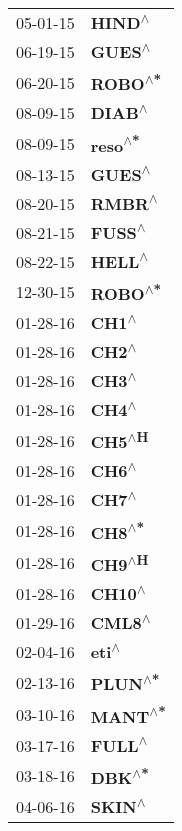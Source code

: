 \begin{supertabular}{p{0.08\textwidth}p{0.2\textwidth}}
 05-01-15 &    \textbf{HIND\textsuperscript{$\wedge$}} \\
 06-19-15 &    \textbf{GUES\textsuperscript{$\wedge$}} \\
 06-20-15 &   \textbf{ROBO\textsuperscript{$\wedge$*}} \\
 08-09-15 &    \textbf{DIAB\textsuperscript{$\wedge$}} \\
 08-09-15 &   \textbf{reso\textsuperscript{$\wedge$*}} \\
 08-13-15 &    \textbf{GUES\textsuperscript{$\wedge$}} \\
 08-20-15 &    \textbf{RMBR\textsuperscript{$\wedge$}} \\
 08-21-15 &    \textbf{FUSS\textsuperscript{$\wedge$}} \\
 08-22-15 &    \textbf{HELL\textsuperscript{$\wedge$}} \\
 12-30-15 &   \textbf{ROBO\textsuperscript{$\wedge$*}} \\
 01-28-16 &     \textbf{CH1\textsuperscript{$\wedge$}} \\
 01-28-16 &     \textbf{CH2\textsuperscript{$\wedge$}} \\
 01-28-16 &     \textbf{CH3\textsuperscript{$\wedge$}} \\
 01-28-16 &     \textbf{CH4\textsuperscript{$\wedge$}} \\
 01-28-16 &    \textbf{CH5\textsuperscript{$\wedge$H}} \\
 01-28-16 &     \textbf{CH6\textsuperscript{$\wedge$}} \\
 01-28-16 &     \textbf{CH7\textsuperscript{$\wedge$}} \\
 01-28-16 &    \textbf{CH8\textsuperscript{$\wedge$*}} \\
 01-28-16 &    \textbf{CH9\textsuperscript{$\wedge$H}} \\
 01-28-16 &    \textbf{CH10\textsuperscript{$\wedge$}} \\
 01-29-16 &    \textbf{CML8\textsuperscript{$\wedge$}} \\
 02-04-16 &     \textbf{eti\textsuperscript{$\wedge$}} \\
 02-13-16 &   \textbf{PLUN\textsuperscript{$\wedge$*}} \\
 03-10-16 &   \textbf{MANT\textsuperscript{$\wedge$*}} \\
 03-17-16 &    \textbf{FULL\textsuperscript{$\wedge$}} \\
 03-18-16 &    \textbf{DBK\textsuperscript{$\wedge$*}} \\
 04-06-16 &    \textbf{SKIN\textsuperscript{$\wedge$}} \\

\end{supertabular}
